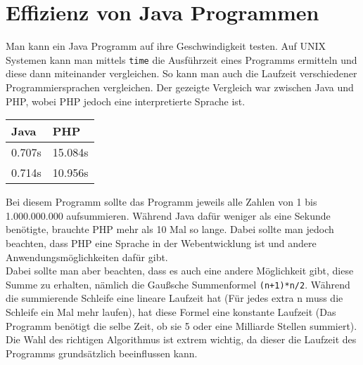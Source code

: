 \documentclass{article}
\begin{document}
	  \section{Effizienz von Java Programmen}
	  Man kann ein Java Programm auf ihre Geschwindigkeit testen. Auf UNIX Systemen kann man mittels \verb|time| die Ausführzeit eines Programms ermitteln und diese dann miteinander vergleichen. So kann man auch die Laufzeit verschiedener Programmiersprachen vergleichen. Der gezeigte Vergleich war zwischen Java und PHP, wobei PHP jedoch eine interpretierte Sprache ist.
	  \begin{center}
		  \begin{tabular}{| l | l |}
		  	\toprule
		  	Java & PHP  \\ \midrule
		  	0.707s & 15.084s \\ \hline
		  	0.714s & 10.956s \\
		  	\bottomrule
		  \end{tabular}
	  \end{center}
	  Bei diesem Programm sollte das Programm jeweils alle Zahlen von 1 bis 1.000.000.000 aufsummieren. Während Java dafür weniger als eine Sekunde benötigte, brauchte PHP mehr als 10 Mal so lange. Dabei sollte man jedoch beachten, dass PHP eine Sprache in der Webentwicklung ist und andere Anwendungsmöglichkeiten dafür gibt. \\
	  Dabei sollte man aber beachten, dass es auch eine andere Möglichkeit gibt, diese Summe zu erhalten, nämlich die Gaußsche Summenformel \verb|(n+1)*n/2|. Während die summierende Schleife eine lineare Laufzeit hat (Für jedes extra n muss die Schleife ein Mal mehr laufen), hat diese Formel eine konstante Laufzeit (Das Programm benötigt die selbe Zeit, ob sie 5 oder eine Milliarde Stellen summiert). Die Wahl des richtigen Algorithmus ist extrem wichtig, da dieser die Laufzeit des Programms grundsätzlich beeinflussen kann.
\end{document}
